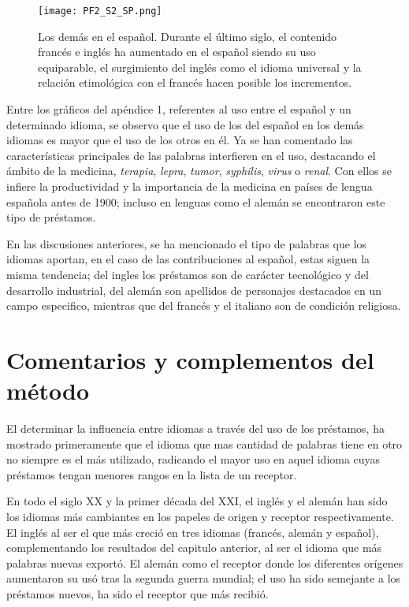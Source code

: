 		
\begin{figure}[h!] %
	\centering
	\texttt{[image: PF2\_S2\_SP.png]}
	\label{fig.ST_b_SP}
	\caption{Los demás en el español.  Durante el último siglo, el contenido francés e inglés ha aumentado en el español siendo su uso equiparable, el surgimiento del inglés como el idioma universal y la relación etimológica con el francés  hacen posible los incrementos.}
\end{figure}



Entre los gráficos del apéndice 1, referentes al uso entre el español y un determinado idioma, se observo que el uso de los del español en los demás idiomas es mayor que el uso de los otros en él.  Ya se han comentado las características principales de las palabras interfieren en el uso, destacando el ámbito de la medicina, \textit{terapia}, \textit{lepra}, \textit{tumor}, \textit{syphilis}, \textit{virus} o \textit{renal}. Con ellos se infiere la productividad y la importancia de la medicina en países de lengua española antes de 1900; incluso en lenguas como el alemán se encontraron este tipo de préstamos. 


En las discusiones anteriores, se ha mencionado el tipo de palabras que los idiomas aportan,  en el caso de las contribuciones al español,   estas siguen la misma tendencia; del ingles los préstamos son de carácter tecnológico y del desarrollo industrial, del alemán son apellidos de personajes destacados en un campo especifico, mientras que del francés y el italiano son de condición religiosa. 

\section{Comentarios y complementos del método} %


El determinar la influencia entre idiomas a través del uso de los préstamos, ha mostrado primeramente que el idioma que mas cantidad de palabras tiene en otro no siempre es el más utilizado,  radicando el mayor uso en aquel idioma cuyas préstamos tengan menores rangos en la lista de un receptor. 

En todo el siglo XX y la primer década del XXI, el inglés y el alemán han sido los idiomas más cambiantes en los papeles de origen y receptor respectivamente.
El inglés al ser el que más creció en tres idiomas (francés, alemán y español), complementando los resultados del capitulo anterior, al ser el idioma que más palabras nuevas exportó.  El alemán como el receptor donde los diferentes orígenes aumentaron su usó tras la segunda guerra mundial; el uso ha sido semejante a los préstamos nuevos, ha sido el receptor que más recibió. 


